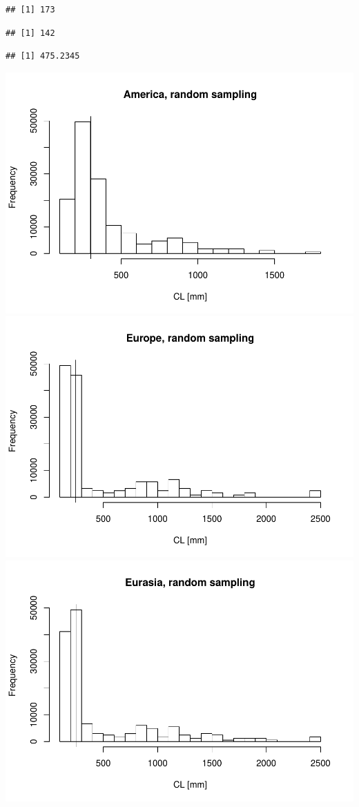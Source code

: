 \documentclass[]{article}
\begin{document}
\begin{verbatim}
## [1] 173
\end{verbatim}

\begin{verbatim}
## [1] 142
\end{verbatim}

\begin{verbatim}
## [1] 475.2345
\end{verbatim}

\includegraphics{MA_JJ_files/figure-latex/RSCon-1.pdf}
\includegraphics{MA_JJ_files/figure-latex/RSCon-2.pdf}
\includegraphics{MA_JJ_files/figure-latex/RSCon-3.pdf}
\end{document}
